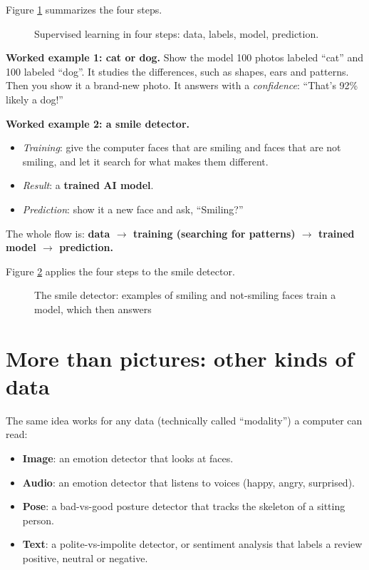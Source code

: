 Figure \ref{fig:supervised-flow} summarizes the four steps.


\begin{figure}[htbp]
\centering
{}
\caption{Supervised learning in four steps: data, labels, model, prediction.}\label{fig:supervised-flow}
\end{figure}

\textbf{Worked example 1: cat or dog.} Show the model 100 photos labeled “cat” and 100 labeled “dog”. It studies the differences, such as shapes, ears and patterns. Then you show it a brand-new photo. It answers with a \emph{confidence}: “That’s 92\% likely a dog!”


\textbf{Worked example 2: a smile detector.}


\begin{itemize}
\item \emph{Training}: give the computer faces that are smiling and faces that are not smiling, and let it search for what makes them different.
\item \emph{Result}: a \textbf{trained AI model}.
\item \emph{Prediction}: show it a new face and ask, “Smiling?”
\end{itemize}

The whole flow is: \textbf{data \ensuremath{\rightarrow} training (searching for patterns) \ensuremath{\rightarrow} trained model \ensuremath{\rightarrow} prediction.}


Figure \ref{fig:smile-detector} applies the four steps to the smile detector.


\begin{figure}[htbp]
\centering
{}
\caption{The smile detector: examples of smiling and not-smiling faces train a model, which then answers }\label{fig:smile-detector}
\end{figure}

\section{More than pictures: other kinds of data}

The same idea works for any data (technically called “modality”) a computer can read:


\begin{itemize}
\item \textbf{Image}: an emotion detector that looks at faces.
\item \textbf{Audio}: an emotion detector that listens to voices (happy, angry, surprised).
\item \textbf{Pose}: a bad-vs-good posture detector that tracks the skeleton of a sitting person.
\item \textbf{Text}: a polite-vs-impolite detector, or sentiment analysis that labels a review positive, neutral or negative.
\end{itemize}

